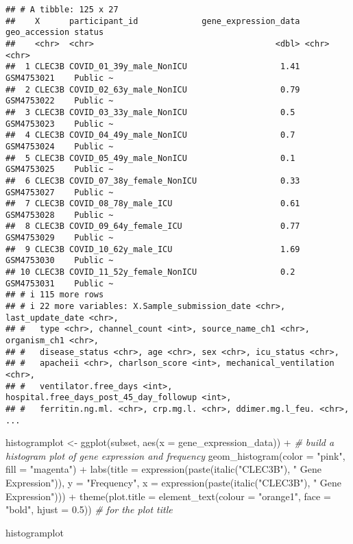 \documentclass[
]{article}
\newenvironment{Shaded}{\begin{snugshade}}{\end{snugshade}}
\newcommand{\AttributeTok}[1]{\textcolor[rgb]{0.77,0.63,0.00}{#1}}
\newcommand{\CommentTok}[1]{\textcolor[rgb]{0.56,0.35,0.01}{\textit{#1}}}
\newcommand{\FloatTok}[1]{\textcolor[rgb]{0.00,0.00,0.81}{#1}}
\newcommand{\FunctionTok}[1]{\textcolor[rgb]{0.00,0.00,0.00}{#1}}
\newcommand{\NormalTok}[1]{#1}
\newcommand{\OtherTok}[1]{\textcolor[rgb]{0.56,0.35,0.01}{#1}}
\newcommand{\SpecialCharTok}[1]{\textcolor[rgb]{0.00,0.00,0.00}{#1}}
\newcommand{\StringTok}[1]{\textcolor[rgb]{0.31,0.60,0.02}{#1}}
\begin{document}
\begin{verbatim}
## # A tibble: 125 x 27
##    X      participant_id             gene_expression_data geo_accession status  
##    <chr>  <chr>                                     <dbl> <chr>         <chr>   
##  1 CLEC3B COVID_01_39y_male_NonICU                   1.41 GSM4753021    Public ~
##  2 CLEC3B COVID_02_63y_male_NonICU                   0.79 GSM4753022    Public ~
##  3 CLEC3B COVID_03_33y_male_NonICU                   0.5  GSM4753023    Public ~
##  4 CLEC3B COVID_04_49y_male_NonICU                   0.7  GSM4753024    Public ~
##  5 CLEC3B COVID_05_49y_male_NonICU                   0.1  GSM4753025    Public ~
##  6 CLEC3B COVID_07_38y_female_NonICU                 0.33 GSM4753027    Public ~
##  7 CLEC3B COVID_08_78y_male_ICU                      0.61 GSM4753028    Public ~
##  8 CLEC3B COVID_09_64y_female_ICU                    0.77 GSM4753029    Public ~
##  9 CLEC3B COVID_10_62y_male_ICU                      1.69 GSM4753030    Public ~
## 10 CLEC3B COVID_11_52y_female_NonICU                 0.2  GSM4753031    Public ~
## # i 115 more rows
## # i 22 more variables: X.Sample_submission_date <chr>, last_update_date <chr>,
## #   type <chr>, channel_count <int>, source_name_ch1 <chr>, organism_ch1 <chr>,
## #   disease_status <chr>, age <chr>, sex <chr>, icu_status <chr>,
## #   apacheii <chr>, charlson_score <int>, mechanical_ventilation <chr>,
## #   ventilator.free_days <int>, hospital.free_days_post_45_day_followup <int>,
## #   ferritin.ng.ml. <chr>, crp.mg.l. <chr>, ddimer.mg.l_feu. <chr>, ...
\end{verbatim}

\begin{Shaded}
\begin{Highlighting}[]
\NormalTok{histogramplot }\OtherTok{\textless{}{-}} \FunctionTok{ggplot}\NormalTok{(subset, }\FunctionTok{aes}\NormalTok{(}\AttributeTok{x =}\NormalTok{ gene\_expression\_data)) }\SpecialCharTok{+} \CommentTok{\# build a histogram plot of gene expression and frequency}
  \FunctionTok{geom\_histogram}\NormalTok{(}\AttributeTok{color =} \StringTok{"pink"}\NormalTok{, }\AttributeTok{fill =} \StringTok{"magenta"}\NormalTok{) }\SpecialCharTok{+}
  \FunctionTok{labs}\NormalTok{(}\AttributeTok{title =} \FunctionTok{expression}\NormalTok{(}\FunctionTok{paste}\NormalTok{(}\FunctionTok{italic}\NormalTok{(}\StringTok{"CLEC3B"}\NormalTok{), }\StringTok{" Gene Expression"}\NormalTok{)), }\AttributeTok{y =} \StringTok{"Frequency"}\NormalTok{, }\AttributeTok{x =} \FunctionTok{expression}\NormalTok{(}\FunctionTok{paste}\NormalTok{(}\FunctionTok{italic}\NormalTok{(}\StringTok{"CLEC3B"}\NormalTok{), }\StringTok{" Gene Expression"}\NormalTok{))) }\SpecialCharTok{+}
    \FunctionTok{theme}\NormalTok{(}\AttributeTok{plot.title =} \FunctionTok{element\_text}\NormalTok{(}\AttributeTok{colour =} \StringTok{"orange1"}\NormalTok{, }\AttributeTok{face =} \StringTok{"bold"}\NormalTok{, }\AttributeTok{hjust =} \FloatTok{0.5}\NormalTok{)) }\CommentTok{\# for the plot title}

\NormalTok{histogramplot}
\end{Highlighting}
\end{Shaded}
\end{document}
